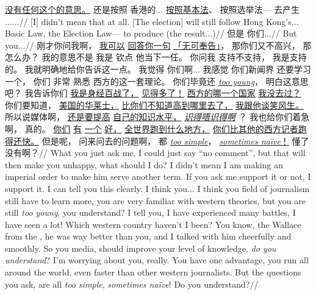 \endgl
\xe
\ex[glhangstyle=none, everygla=\rm, exnoformat=X:, exno={\smallcaps{ji}}, belowexskip=0pt, aboveexskip=-.5cm]
\begingl
\gla
{} {\underline{没有任何这个的意思。}} {} {还是按照} {香港的$\ldots$} {\underline{按照基本法}、} {按照选举法---} {去产生} {$\ldots\ldots$}//
\glb
{[I]} {didn't mean that at all.} {[The election]} {will still follow} {Hong Kong's$\ldots$} {Basic Law,} {the Election Law---} {to produce} {(the result$\ldots$)}//
\endgl
\xe
\ex[glhangstyle=none, everygla=\rm, exnoformat=X:, exno={\smallcaps{jo}}, belowexskip=0pt, aboveexskip=-.5cm]
\begingl
\gla
{但是} {你们$\ldots$}//
\glb
{But} {you$\ldots$}//
\endgl
\xe
\ex[glhangstyle=none, everygla=\rm, exnoformat=X:, exno={\smallcaps{ji}}, belowexskip=0pt, aboveexskip=-.5cm]
\begingl
\gla
{刚才你问我啊，} {\underline{我可以}} {\underline{回答你一句}} {\underline{「无可奉告」}，} {那你们又不高兴，} {那怎么办？} {我的意思不是} {我是} {钦点} {他当下一任。} {你问我} {支持不支持，} {我是支持的。} {我就明确地给你告诉这一点。} {我觉得} {你们啊$\ldots$} {我感觉} {你们新闻界} {还要学习一个，} {你们} {非常} {熟悉} { 西方的这一套理论。 } {你们毕竟还} {\textit{\underline{too young}}，} {明白这意思吧？} {我告诉你们} {\underline{我是身经百战了，}} {\underline{见得多了！}} {\underline{西方的哪一个国家}} {\underline{我没去过？}} {你们要知道，} {\underline{美国的华莱士，}} {\underline{比你们不知道高到哪里去了，}} {\underline{我跟他谈笑风生。}} {所以说媒体啊，} {\underline{还是要提高}} {\underline{自己的知识水平，}} {\textit{\underline{识得唔识得啊}} \cann？} {我也给你们着急啊，} {真的。} {\underline{你们}} {\underline{有}} {\underline{一个}} {\underline{好，}} {\underline{全世界跑到什么地方，}} {\underline{你们比其他的西方记者跑得还快。}} {但是呢，} {问来问去的问题啊，} {都} {\textit{\underline{too simple}}，} {\underline{\textit{sometimes na\"{i}ve}！}} {懂了没有啊？}//
\glb
{What you just ask me,} {I could} {just say} {``no comment'',} {but that will then make you unhappy,} {what should I do?} {I didn't mean} {I am} {making an imperial order} {to make him serve another term.} {If you ask me} {support it or not,} {I support it.} {I can tell you this clearly.} {I think} {you$\ldots$} {I think} {you field of journalism} {still have to learn more,} {you are} {very} {familiar with} {western theories,} {but you are still} {\textit{too young},} {you understand?} {I tell you,} {I have experienced many battles,} {I have seen a lot!} {Which western country} {haven't I been?} {You know,} {the Wallace from the \usa,} {he was way better than you,} {and I talked with him cheerfully and smoothly.} {So you media,} {should improve} {your level of knowledge,} {\textit{do you understand}?} {I'm worrying about you,} {really.} {You} {have} {one} {advantage,} {you run all around the world,} {even faster than other western journalists.} {But} {the questions you ask,} {are all} {\textit{too simple},} {\textit{sometimes na\"{i}ve}!} {Do you understand?}//
